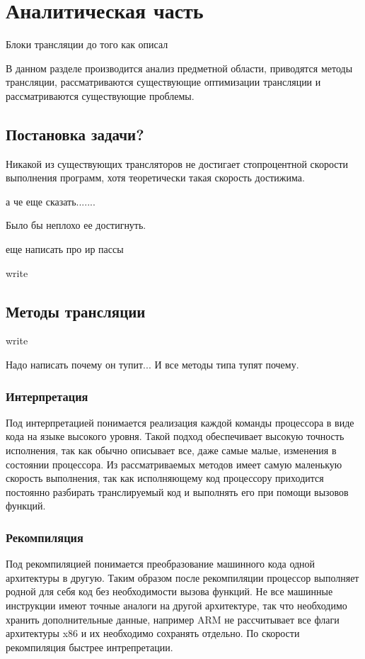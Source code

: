 \section{Аналитическая часть}

Блоки трансляции до того как описал

 
В данном разделе производится анализ предметной области, приводятся методы трансляции, рассматриваются существующие оптимизации трансляции и рассматриваются существующие проблемы.
 
\subsection{Постановка задачи?}
 
Никакой из существующих трансляторов не достигает стопроцентной скорости выполнения программ, хотя теоретически такая скорость достижима.
 
а че еще сказать.......

Было бы неплохо ее достигнуть.

еще написать про ир пассы

write

\subsection{Методы трансляции}

write

Надо написать почему он тупит... И все методы типа тупят почему.

\subsubsection{Интерпретация}

Под интерпретацией понимается реализация каждой команды процессора в виде кода на языке высокого уровня. Такой подход обеспечивает высокую точность исполнения, так как обычно описывает все, даже самые малые, изменения в состоянии процессора. Из рассматриваемых методов имеет самую маленькую скорость выполнения, так как исполняющему код процессору приходится постоянно разбирать транслируемый код и выполнять его при помощи вызовов функций.

\subsubsection{Рекомпиляция}

Под рекомпиляцией понимается преобразование машинного кода одной архитектуры в другую. Таким образом после рекомпиляции процессор выполняет родной для себя код без необходимости вызова функций. Не все машинные инструкции имеют точные аналоги на другой архитектуре, так что необходимо хранить дополнительные данные, например ARM не рассчитывает все флаги архитектуры x86 и их необходимо сохранять отдельно. По скорости рекомпиляция быстрее интрепретации.


